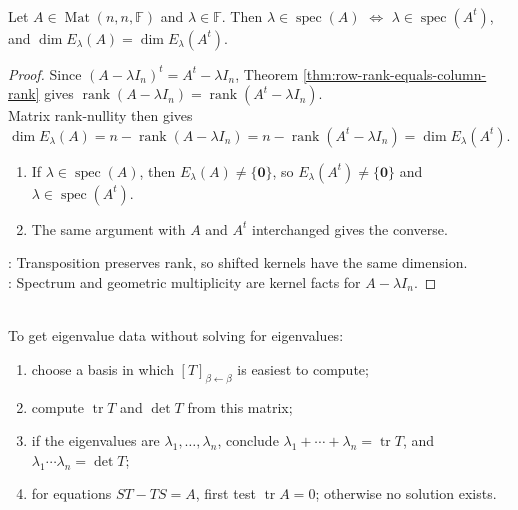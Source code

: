 \begin{proposition} \label{prop:transpose-preserves-spectrum-and-geometric-multiplicity} \\
Let $A\in\operatorname{Mat}(n,n,\mathbb{F})$ and $\lambda\in\mathbb{F}$. Then $\lambda\in\operatorname{spec}(A)$ $\Longleftrightarrow$ $\lambda\in\operatorname{spec}(A^t)$, and $\dim E_{\lambda}(A)=\dim E_{\lambda}(A^t)$.
\begin{proof}
Since $(A-\lambda I_n)^t=A^t-\lambda I_n$, Theorem \ref{thm:row-rank-equals-column-rank} gives $\operatorname{rank}(A-\lambda I_n)=\operatorname{rank}(A^t-\lambda I_n)$.\\
Matrix rank-nullity then gives $\dim E_{\lambda}(A) =n-\operatorname{rank}(A-\lambda I_n) =n-\operatorname{rank}(A^t-\lambda I_n) =\dim E_{\lambda}(A^t)$.
\begin{enumerate}[label=\roman*.]
\setlength{\itemsep}{0pt}
\item[$(\Rightarrow)$] If $\lambda\in\operatorname{spec}(A)$, then $E_{\lambda}(A)\neq\{\mathbf{0}\}$, so $E_{\lambda}(A^t)\neq\{\mathbf{0}\}$ and $\lambda\in\operatorname{spec}(A^t)$.
\item[$(\Leftarrow)$] The same argument with $A$ and $A^t$ interchanged gives the converse.
\end{enumerate}
: Transposition preserves rank, so shifted kernels have the same dimension.\\
: Spectrum and geometric multiplicity are kernel facts for $A-\lambda I_n$.
\end{proof}
\end{proposition}

\begin{method} \label{meth:trace-determinant-invariant-computation} \\
To get eigenvalue data without solving for eigenvalues:
\begin{enumerate}[label=(\roman*)]
\setlength{\itemsep}{0pt}
\item choose a basis in which $[T]_{\beta\leftarrow\beta}$ is easiest to compute;
\item compute $\operatorname{tr}T$ and $\det T$ from this matrix;
\item if the eigenvalues are $\lambda_1,\ldots,\lambda_n$, conclude $\lambda_1+\cdots+\lambda_n=\operatorname{tr}T$, and $\lambda_1\cdots\lambda_n=\det T$;
\item for equations $ST-TS=A$, first test $\operatorname{tr}A=0$; otherwise no solution exists.
\end{enumerate}
\end{method}

